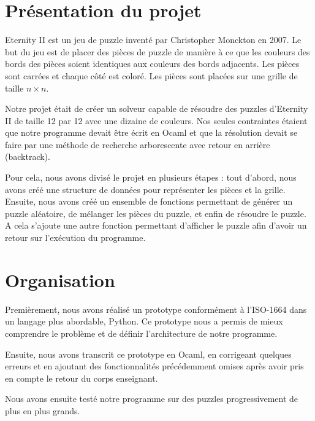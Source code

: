 \documentclass[french]{rapport}
\title{\LARGE{\titreGeneral}}%
\author{\auteurA \\ \auteurB}%
\date{2023-24}
\begin{document}
\setlength{\parindent}{1cm}%


\tableofcontents
\newpage

\section{Présentation du projet}

Eternity II est un jeu de puzzle inventé par Christopher Monckton en
2007. Le but du jeu est de placer des pièces de puzzle de manière à
ce que les couleurs des bords des pièces soient identiques aux
couleurs des bords adjacents.  Les pièces sont carrées et chaque
côté est coloré. Les pièces sont placées sur une grille de taille
$n \times n$.

Notre projet était de créer un solveur capable de résoudre des
puzzles d’Eternity II de taille 12 par 12 avec une dizaine de
couleurs. Nos seules contraintes étaient que notre programme devait
être écrit en Ocaml et que la résolution devait se faire par une
méthode de recherche arborescente avec retour en arrière (backtrack).

Pour cela, nous avons divisé le projet en plusieurs étapes :
tout d’abord, nous avons créé une structure de données pour
représenter les pièces et la grille. Ensuite, nous avons créé un
ensemble de fonctions permettant de générer un puzzle aléatoire,
de mélanger les pièces du puzzle, et enfin de résoudre le puzzle.
A cela s’ajoute une autre fonction permettant d'afficher le puzzle
afin d'avoir un retour sur l'exécution du programme.

\section{Organisation}

Premièrement, nous avons réalisé un prototype conformément à
l'ISO-1664 dans un langage plus abordable, Python. Ce prototype
nous a permis de mieux comprendre le problème et de définir
l'architecture de notre programme.

Ensuite, nous avons transcrit ce prototype en Ocaml, en corrigeant
quelques erreurs et en ajoutant des fonctionnalités précédemment
omises après avoir pris en compte le retour du corps enseignant.

Nous avons ensuite testé notre programme sur des puzzles
progressivement de plus en plus grands.
\end{document}
